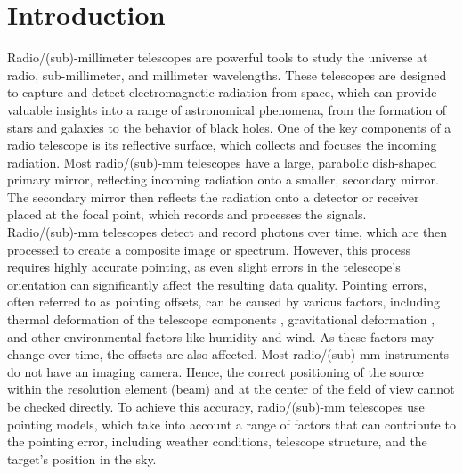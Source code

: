 \section{Introduction}
Radio/(sub)-millimeter telescopes are powerful tools to study the universe at radio, sub-millimeter, and millimeter wavelengths.
These telescopes are designed to capture and detect electromagnetic radiation from space, which can provide valuable insights into a range of astronomical phenomena,
from the formation of stars and galaxies to the behavior of black holes.
One of the key components of a radio telescope is its reflective surface, which collects and focuses the incoming radiation.
Most radio/(sub)-mm telescopes have a large, parabolic dish-shaped primary mirror, reflecting incoming radiation onto a smaller, secondary mirror.
The secondary mirror then reflects the radiation onto a detector or receiver placed at the focal point, which records and processes the signals.\\

Radio/(sub)-mm telescopes detect and record photons over time, which are then processed to create a composite image or spectrum.
However, this process requires highly accurate pointing, as even slight errors in the telescope's orientation can significantly affect the resulting data quality.
Pointing errors, often referred to as pointing offsets, can be caused by various factors, including thermal deformation of the telescope components \cite{Dong2018},
gravitational deformation \cite{GravDeformation}, and other environmental factors like humidity and wind. As these factors may change over time, the offsets are also affected.
Most radio/(sub)-mm instruments do not have an imaging camera.
Hence, the correct positioning of the source within the resolution element (beam) and at the center of the field of view cannot be checked directly.
To achieve this accuracy, radio/(sub)-mm telescopes use pointing models, which take into account a range of factors that can contribute to the pointing error,
including weather conditions, telescope structure, and the target's position in the sky.\\

